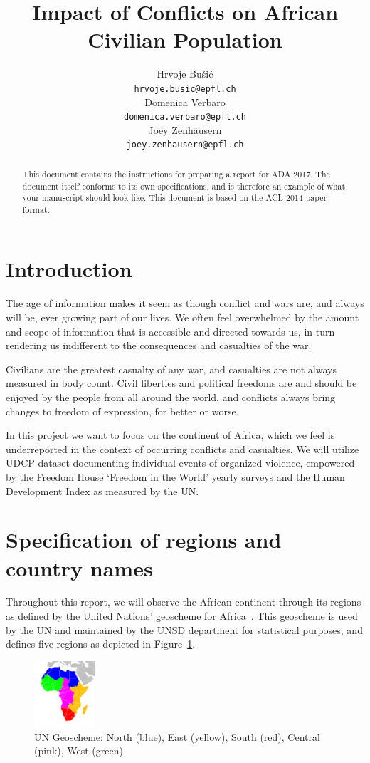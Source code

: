 \documentclass[a4paper,11pt]{article}
\title{Impact of Conflicts on African Civilian Population}
\author{Hrvoje Bušić \\
  \small{\tt hrvoje.busic@epfl.ch} \\\And
  Domenica Verbaro\\
  \small{\tt domenica.verbaro@epfl.ch} \\\And
Joey Zenhäusern\\
\small{\tt joey.zenhausern@epfl.ch} \\}
\date{}
\begin{document}
\maketitle
\begin{abstract}
  This document contains the instructions for preparing a report for ADA 2017. The document itself conforms to its own specifications, and is therefore an example of
  what your manuscript should look like. This document is based on the ACL 2014 paper format.
\end{abstract}

\section{Introduction}

The age of information makes it seem as though conflict and wars are, and always will be, ever growing part of our lives. We often feel overwhelmed by the amount and scope of information that is accessible and directed towards us, in turn rendering us indifferent to the consequences and casualties of the war.

Civilians are the greatest casualty of any war, and casualties are not always measured in body count. Civil liberties and political freedoms are and should be enjoyed by the people from all around the world, and conflicts always bring changes to freedom of expression, for better or worse.

In this project we want to focus on the continent of Africa, which we feel is underreported in the context of occurring conflicts and casualties. We will utilize UDCP dataset documenting individual events of organized violence, empowered by the Freedom House `Freedom in the World' yearly surveys and the Human Development Index as measured by the UN.

\section{Specification of regions and country
names}

Throughout this report, we will observe the African continent through its
regions as defined by the United Nations' geoscheme for Africa~\cite{UNGeoscheme}. This geoscheme is used by the UN and
maintained by the UNSD department for statistical purposes, and defines
five regions as depicted in Figure~\ref{fig:regions}.
\begin{figure}[ht!]
    \centering
    \includegraphics[width=0.2\textwidth]{images/Africa-regions.png}
    \caption{\footnotesize{UN Geoscheme: North (blue), East (yellow), South (red), Central (pink), West (green)\label{fig:regions}}}
\end{figure}
\end{document}

